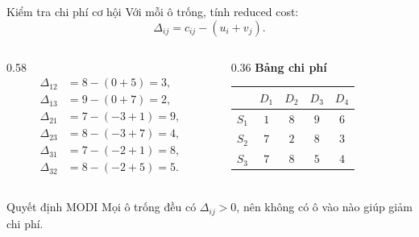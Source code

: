 \documentclass[10pt]{beamer}
\begin{document}
\begin{frame}{Kiểm tra chi phí cơ hội}
    Với mỗi ô trống, tính reduced cost:
    \[
        \Delta_{ij}=c_{ij}-(u_i+v_j).
    \]

    \vspace{-0.1cm}
    \begin{columns}[c]
        \begin{column}{0.58\textwidth}
            \[
            \begin{aligned}
                \Delta_{12}&=8-(0+5)=3,\\
                \Delta_{13}&=9-(0+7)=2,\\
                \Delta_{21}&=7-(-3+1)=9,\\
                \Delta_{23}&=8-(-3+7)=4,\\
                \Delta_{31}&=7-(-2+1)=8,\\
                \Delta_{32}&=8-(-2+5)=5.
            \end{aligned}
            \]
        \end{column}
        \begin{column}{0.36\textwidth}
            \centering
            \scriptsize
            \textbf{Bảng chi phí}\\[0.08cm]
            \renewcommand{\arraystretch}{1.2}
            \begin{tabular}{c|cccc}
                & $D_1$ & $D_2$ & $D_3$ & $D_4$\\
                \hline
                $S_1$ & \cellcolor{occupied}$1$ & \cellcolor{checkcell}$8$ & \cellcolor{checkcell}$9$ & \cellcolor{epsiloncell}$6$\\
                $S_2$ & \cellcolor{checkcell}$7$ & \cellcolor{occupied}$2$ & \cellcolor{checkcell}$8$ & \cellcolor{occupied}$3$\\
                $S_3$ & \cellcolor{checkcell}$7$ & \cellcolor{checkcell}$8$ & \cellcolor{occupied}$5$ & \cellcolor{occupied}$4$
            \end{tabular}
        \end{column}
    \end{columns}

    \vspace{0.05cm}
    \begin{alertblock}{Quyết định MODI}
        Mọi ô trống đều có $\Delta_{ij}>0$, nên không có ô vào nào giúp giảm chi phí.
    \end{alertblock}
\end{frame}
\end{document}
